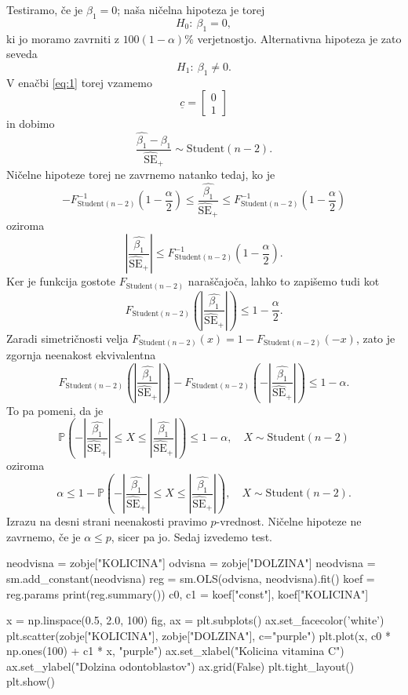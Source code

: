 \documentclass[10pt, a4paper]{article}
\newcommand{\prob}{\mathbb {P}}
\DeclareMathOperator{\se}{SE}
\begin{document}
Testiramo, če je $\beta_1 = 0$; naša ničelna hipoteza je torej 
$$H_0:\ \beta_1 = 0,$$
ki jo moramo zavrniti z $100(1 - \alpha)\%$ verjetnostjo.
Alternativna hipoteza je zato seveda $$H_1:\ \beta_1 \neq 0.$$
V enačbi \eqref{eq:1} torej vzamemo $$\underline{c} = \begin{bmatrix}
    0\\ 1
\end{bmatrix}$$ in dobimo 
$$\frac{\widehat{\beta_1} - \beta_1}{\widehat{\se}_+} \sim \mathrm{Student} (n - 2).$$
Ničelne hipoteze torej ne zavrnemo natanko tedaj, ko je 
$$-F^{-1}_{\mathrm{Student} (n - 2)} \left(1 - \frac{\alpha}{2}\right) \leq \frac{\widehat{\beta_1}}{\widehat{\se}_+} \leq F^{-1}_{\mathrm{Student} (n - 2)} \left(1 - \frac{\alpha}{2}\right)$$
oziroma 
$$\left| \frac{\widehat{\beta_1}}{\widehat{\se}_+} \right| \leq F^{-1}_{\mathrm{Student} (n - 2)} \left(1 - \frac{\alpha}{2}\right).$$
Ker je funkcija gostote $F_{\mathrm{Student} (n - 2)}$ naraščajoča, lahko to zapišemo tudi kot 
$$F_{\mathrm{Student} (n - 2)} \left(\left| \frac{\widehat{\beta_1}}{\widehat{\se}_+} \right|\right) \leq 1 - \frac{\alpha}{2}.$$
Zaradi simetričnosti velja $F_{\mathrm{Student} (n - 2)} (x) = 1 - F_{\mathrm{Student} (n - 2)}(-x)$, zato je zgornja neenakost ekvivalentna 
$$F_{\mathrm{Student} (n - 2)} \left(\left| \frac{\widehat{\beta_1}}{\widehat{\se}_+} \right|\right) - F_{\mathrm{Student} (n - 2)} \left(-\left| \frac{\widehat{\beta_1}}{\widehat{\se}_+} \right|\right) \leq 1 - \alpha.$$
To pa pomeni, da je 
$$\prob \left(-\left| \frac{\widehat{\beta_1}}{\widehat{\se}_+} \right| \leq X \leq \left| \frac{\widehat{\beta_1}}{\widehat{\se}_+} \right|\right) \leq 1 - \alpha,\quad X \sim \mathrm{Student} (n - 2)$$
oziroma
$$\alpha \leq 1 - \prob \left(-\left| \frac{\widehat{\beta_1}}{\widehat{\se}_+} \right| \leq X \leq \left| \frac{\widehat{\beta_1}}{\widehat{\se}_+} \right|\right),\quad X \sim \mathrm{Student} (n - 2).$$
Izrazu na desni strani neenakosti pravimo $p$-vrednost. Ničelne hipoteze ne zavrnemo,
če je $\alpha \leq p$, sicer pa jo. Sedaj izvedemo test.

\begin{python}
    neodvisna = zobje["KOLICINA"]
    odvisna = zobje["DOLZINA"]
    neodvisna = sm.add_constant(neodvisna)
    reg = sm.OLS(odvisna, neodvisna).fit()
    koef = reg.params
    print(reg.summary())
    c0, c1 = koef["const"], koef["KOLICINA"]

    x = np.linspace(0.5, 2.0, 100)
    fig, ax = plt.subplots()
    ax.set_facecolor('white')
    plt.scatter(zobje["KOLICINA"], zobje["DOLZINA"], c="purple")
    plt.plot(x, c0 * np.ones(100) + c1 * x, "purple")
    ax.set_xlabel("Kolicina vitamina C")
    ax.set_ylabel("Dolzina odontoblastov")
    ax.grid(False)
    plt.tight_layout()
    plt.show()
\end{python}
\end{document}
